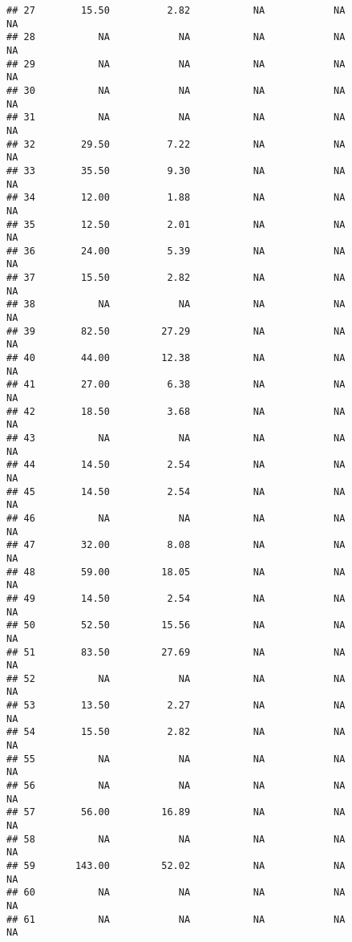 \documentclass[]{article}
\begin{document}
\begin{verbatim}
## 27        15.50          2.82           NA            NA              NA
## 28           NA            NA           NA            NA              NA
## 29           NA            NA           NA            NA              NA
## 30           NA            NA           NA            NA              NA
## 31           NA            NA           NA            NA              NA
## 32        29.50          7.22           NA            NA              NA
## 33        35.50          9.30           NA            NA              NA
## 34        12.00          1.88           NA            NA              NA
## 35        12.50          2.01           NA            NA              NA
## 36        24.00          5.39           NA            NA              NA
## 37        15.50          2.82           NA            NA              NA
## 38           NA            NA           NA            NA              NA
## 39        82.50         27.29           NA            NA              NA
## 40        44.00         12.38           NA            NA              NA
## 41        27.00          6.38           NA            NA              NA
## 42        18.50          3.68           NA            NA              NA
## 43           NA            NA           NA            NA              NA
## 44        14.50          2.54           NA            NA              NA
## 45        14.50          2.54           NA            NA              NA
## 46           NA            NA           NA            NA              NA
## 47        32.00          8.08           NA            NA              NA
## 48        59.00         18.05           NA            NA              NA
## 49        14.50          2.54           NA            NA              NA
## 50        52.50         15.56           NA            NA              NA
## 51        83.50         27.69           NA            NA              NA
## 52           NA            NA           NA            NA              NA
## 53        13.50          2.27           NA            NA              NA
## 54        15.50          2.82           NA            NA              NA
## 55           NA            NA           NA            NA              NA
## 56           NA            NA           NA            NA              NA
## 57        56.00         16.89           NA            NA              NA
## 58           NA            NA           NA            NA              NA
## 59       143.00         52.02           NA            NA              NA
## 60           NA            NA           NA            NA              NA
## 61           NA            NA           NA            NA              NA

\end{verbatim}
\end{document}
